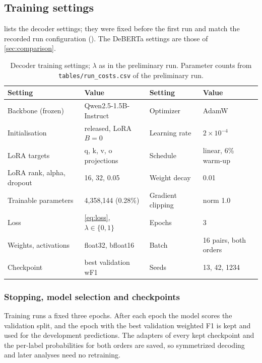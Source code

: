 \subsection{Training settings}
\label{sec:protocol-training}

 lists the decoder settings; they were fixed before the first run and match the recorded run configuration (). The DeBERTa settings are those of \cref{sec:comparison}.

\begin{table}[H]
\centering
\footnotesize
\begin{tabular}{@{}ll@{\hspace{2.5em}}ll@{}}
\toprule
Setting & Value & Setting & Value \\
\midrule
Backbone (frozen) & Qwen2.5-1.5B-Instruct & Optimizer & AdamW \\
Initialisation & released, LoRA $B = 0$ & Learning rate & $2 \times 10^{-4}$ \\
LoRA targets & q, k, v, o projections & Schedule & linear, 6\% warm-up \\
LoRA rank, alpha, dropout & 16, 32, 0.05 & Weight decay & 0.01 \\
Trainable parameters & 4{,}358{,}144 (0.28\%) & Gradient clipping & norm 1.0 \\
Loss & \cref{eq:loss}, $\lambda \in \{0, 1\}$ & Epochs & 3 \\
Weights, activations & float32, bfloat16 & Batch & 16 pairs, both orders \\
Checkpoint & best validation wF1 & Seeds & 13, 42, 1234 \\
\bottomrule
\end{tabular}
\caption{Decoder training settings; $\lambda$ as in the preliminary run. Parameter counts from \texttt{tables/run\_costs.csv} of the preliminary run.}
\label{tab:protocol}
\end{table}

\subsubsection*{Stopping, model selection and checkpoints}
Training runs a fixed three epochs. After each epoch the model scores the validation split, and the epoch with the best validation weighted F1 is kept and used for the development predictions. The adapters of every kept checkpoint and the per-label probabilities for both orders are saved, so symmetrized decoding and later analyses need no retraining.

